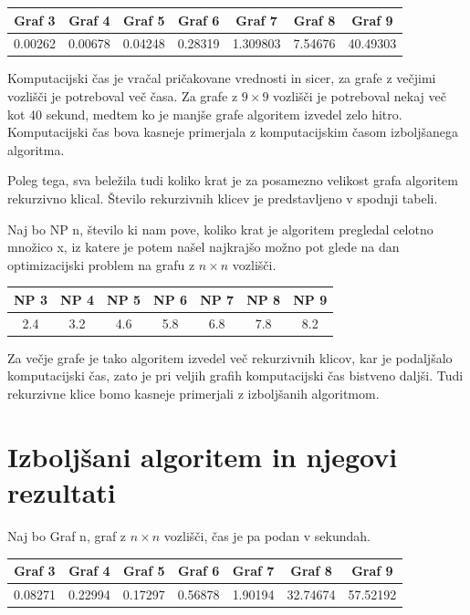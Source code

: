 \documentclass[a4paper, 12 pt]{article}
\theoremstyle{definition} %
\theoremstyle{plain} %
\theoremstyle{definition}
\begin{document}
\begin{center}
 \begin{tabular}{||c c c c c c c||} 
 \hline
Graf 3 & Graf 4 & Graf 5 & Graf 6 & Graf 7 & Graf 8 & Graf 9 \\ 
 \hline
\hline
 0.00262 & 0.00678 & 0.04248& 0.28319 & 1.309803&7.54676 & 40.49303\\ 
 \hline
\end{tabular}
\end{center}

Komputacijski čas je vračal pričakovane vrednosti in sicer, za grafe z večjimi vozlišči je potreboval več časa. Za grafe z $9 \times 9$ vozlišči je potreboval nekaj več kot 40 sekund, medtem ko je manjše grafe algoritem izvedel zelo hitro. Komputacijski čas bova kasneje primerjala z komputacijskim časom izboljšanega algoritma.

Poleg tega, sva beležila tudi koliko krat je za posamezno velikost grafa algoritem rekurzivno klical. Število rekurzivnih klicev je predstavljeno v spodnji tabeli.\newline

\bigskip
Naj bo NP n, število ki nam pove, koliko krat je algoritem pregledal celotno množico x, iz katere je potem našel najkrajšo možno pot glede na dan optimizacijski problem na grafu z $n \times n$ vozlišči.
\begin{center}
 \begin{tabular}{||c c c c c c c||} 
 \hline
 NP 3 &  NP 4 &  NP 5 &  NP 6 &  NP 7 &  NP 8 &  NP 9 \\ 
 \hline
\hline
2.4 & 3.2 & 4.6 & 5.8 & 6.8 & 7.8 &  8.2\\ 
 \hline
\end{tabular}
\end{center}


Za večje grafe je tako algoritem izvedel več rekurzivnih klicov, kar je podaljšalo komputacijski čas, zato je pri veljih grafih komputacijski čas bistveno daljši.
Tudi rekurzivne klice bomo kasneje primerjali z izboljšanih algoritmom.


\section{Izboljšani algoritem in njegovi rezultati}

Naj bo Graf n, graf z $n \times n$ vozlišči, čas je pa podan v sekundah.
\begin{center}
 \begin{tabular}{||c c c c c c c||} 
 \hline
Graf 3 & Graf 4 & Graf 5 & Graf 6 & Graf 7 & Graf 8 & Graf 9 \\ 
 \hline
\hline
0.08271 & 0.22994 & 0.17297 & 0.56878 & 1.90194 & 32.74674 &  57.52192\\ 
 \hline
\end{tabular}
\end{center}
\end{document}
